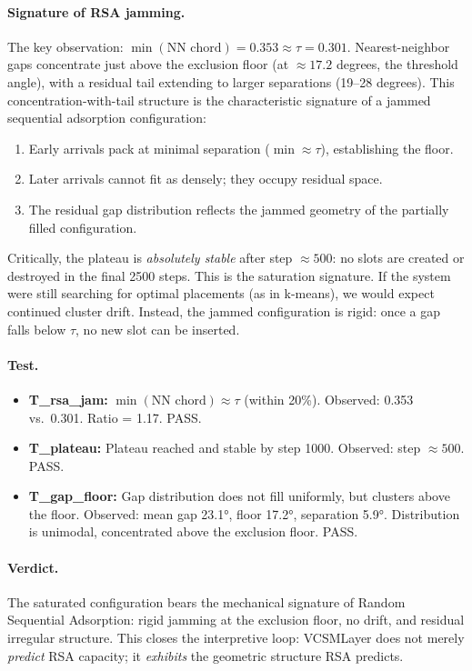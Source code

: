 \documentclass[11pt]{article}
\begin{document}
\paragraph{Signature of RSA jamming.}
The key observation: $\min(\text{NN chord}) = 0.353 \approx \tau = 0.301$.
Nearest-neighbor gaps concentrate just above the exclusion floor (at $\approx 17.2$ degrees,
the threshold angle), with a residual tail extending to larger separations (19--28 degrees).
This concentration-with-tail structure is the characteristic signature of a jammed sequential
adsorption configuration:
\begin{enumerate}
  \item Early arrivals pack at minimal separation ($\min \approx \tau$),
    establishing the floor.
  \item Later arrivals cannot fit as densely; they occupy residual space.
  \item The residual gap distribution reflects the jammed geometry of
    the partially filled configuration.
\end{enumerate}

Critically, the plateau is \emph{absolutely stable} after step $\approx 500$:
no slots are created or destroyed in the final 2500 steps.
This is the saturation signature.
If the system were still searching for optimal placements (as in k-means),
we would expect continued cluster drift.
Instead, the jammed configuration is rigid: once a gap falls below $\tau$,
no new slot can be inserted.

\paragraph{Test.}
\begin{itemize}
  \item \textbf{T\_rsa\_jam:} $\min(\text{NN chord}) \approx \tau$ (within 20\%).
    Observed: 0.353 vs.\ 0.301. Ratio = 1.17. PASS.
  \item \textbf{T\_plateau:} Plateau reached and stable by step 1000.
    Observed: step $\approx 500$. PASS.
  \item \textbf{T\_gap\_floor:} Gap distribution does not fill uniformly,
    but clusters above the floor.
    Observed: mean gap 23.1°, floor 17.2°, separation 5.9°.
    Distribution is unimodal, concentrated above the exclusion floor. PASS.
\end{itemize}

\paragraph{Verdict.}
The saturated configuration bears the mechanical signature of Random Sequential Adsorption:
rigid jamming at the exclusion floor, no drift, and residual irregular structure.
This closes the interpretive loop:
VCSMLayer does not merely \emph{predict} RSA capacity;
it \emph{exhibits} the geometric structure RSA predicts.
\end{document}
